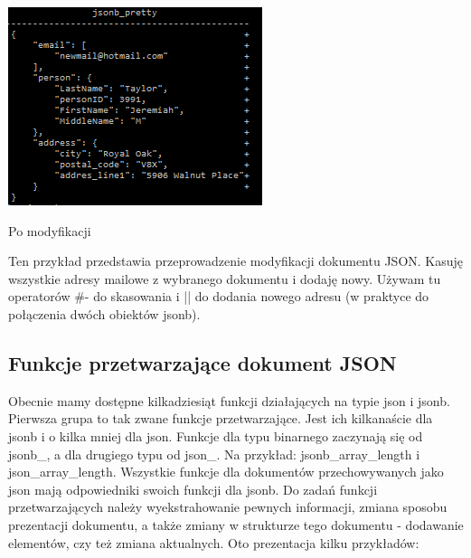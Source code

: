 \documentclass[a4paper,12pt,table]{article}
\begin{document}
{\begin{minipage}{0.5\textwidth}
\end{minipage}
\begin{minipage}{0.5\textwidth}
\makeatletter
\def\@captype{figure}
\makeatother
\begin{center}
\includegraphics[scale=1]{sc/26}
\caption{Po modyfikacji}

\end{center}

\end{minipage}
\vspace{0.5cm}

Ten przykład przedstawia przeprowadzenie modyfikacji dokumentu JSON. Kasuję wszystkie adresy mailowe z wybranego dokumentu i dodaję nowy. Używam tu operatorów \#- do skasowania i || do dodania nowego adresu (w praktyce do połączenia dwóch obiektów jsonb).
\setlength{\parskip}{1\bigskipamount plus \smallskipamount minus \smallskipamount}

\newpage

\subsection{Funkcje przetwarzające dokument JSON}
Obecnie mamy dostępne kilkadziesiąt funkcji działających na typie json i jsonb. Pierwsza grupa to tak zwane funkcje przetwarzające. Jest ich kilkanaście dla jsonb i o kilka mniej dla json. Funkcje dla typu binarnego zaczynają się od jsonb\_, a dla drugiego typu od json\_. Na przykład:
jsonb\_array\_length
i
json\_array\_length.
Wszystkie funkcje dla dokumentów przechowywanych jako json mają odpowiedniki swoich funkcji dla jsonb. Do zadań funkcji przetwarzających należy wyekstrahowanie pewnych informacji, zmiana sposobu prezentacji dokumentu, a także zmiany w strukturze tego dokumentu - dodawanie elementów, czy też zmiana aktualnych. Oto prezentacja kilku przykładów:
\setlength{\parskip}{0.5\bigskipamount plus \smallskipamount minus \smallskipamount}
\setlength{\intextsep}{15pt plus 2pt minus 2pt}
}
\end{document}
